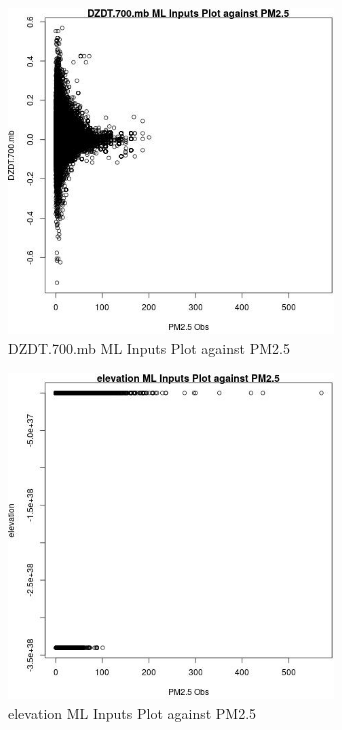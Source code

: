 \clearpage 

\begin{figure} 
\centering  
\includegraphics[width=0.77\textwidth]{Code_Outputs/ML_input_report_ML_input_PM25_Step5_part_d_de_duplicated_aves_ML_input_DZDT700mbvPM25_Obs.jpg} 
\caption{\label{fig:ML_input_report_ML_input_PM25_Step5_part_d_de_duplicated_aves_ML_inputDZDT700mbvPM25_Obs}DZDT.700.mb ML Inputs Plot against PM2.5} 
\end{figure} 
 

\begin{figure} 
\centering  
\includegraphics[width=0.77\textwidth]{Code_Outputs/ML_input_report_ML_input_PM25_Step5_part_d_de_duplicated_aves_ML_input_elevationvPM25_Obs.jpg} 
\caption{\label{fig:ML_input_report_ML_input_PM25_Step5_part_d_de_duplicated_aves_ML_inputelevationvPM25_Obs}elevation ML Inputs Plot against PM2.5} 
\end{figure} 
 

